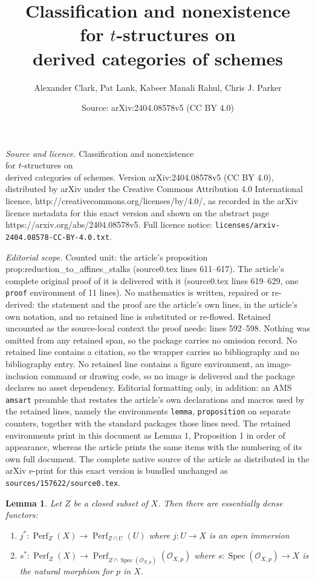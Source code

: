 \documentclass[10pt,a4paper]{amsart}
\title{Classification and nonexistence \\ for $t$-structures on \\ derived categories of schemes}
\author{Alexander Clark, Pat Lank, Kabeer Manali Rahul, Chris J. Parker}
\date{Source: arXiv:2404.08578v5 (CC BY 4.0)}
\newtheorem{lemma}{Lemma}
\begin{document}
\maketitle

\noindent\emph{Source and licence.} Classification and nonexistence \\ for $t$-structures on \\ derived categories of schemes. Version arXiv:2404.08578v5 (CC BY 4.0), distributed by arXiv under the Creative Commons Attribution 4.0 International licence, http://creativecommons.org/licenses/by/4.0/, as recorded in the arXiv licence metadata for this exact version and shown on the abstract page https://arxiv.org/abs/2404.08578v5. Full licence notice: \texttt{licenses/arxiv-2404.08578-CC-BY-4.0.txt}.\par\smallskip

\noindent\textit{Editorial scope.} Counted unit: the article's proposition prop:reduction\_to\_affines\_stalks (source0.tex lines 611--617). The article's complete original proof of it is delivered with it (source0.tex lines 619--629, one \texttt{proof} environment of 11 lines). No mathematics is written, repaired or re-derived: the statement and the proof are the article's own lines, in the article's own notation, and no retained line is substituted or re-flowed.  Retained uncounted as the source-local context the proof needs: lines 592--598.  Nothing was omitted from any retained span, so the package carries no omission record.  No retained line contains a citation, so the wrapper carries no bibliography and no bibliography entry.  No retained line contains a figure environment, an image-inclusion command or drawing code, so no image is delivered and the package declares no asset dependency.  Editorial formatting only, in addition: an AMS \texttt{amsart} preamble that restates the article's own declarations and macros used by the retained lines, namely the environments \texttt{lemma}, \texttt{proposition} on separate counters, together with the standard packages those lines need.  The retained environments print in this document as Lemma 1, Proposition 1 in order of appearance, whereas the article prints the same items with the numbering of its own full document.  The complete native source of the article as distributed in the arXiv e-print for this exact version is bundled unchanged as \texttt{sources/157622/source0.tex}.
\begin{lemma}\label{lem:global_to_open_perfect_supported}
    Let $Z$ be a closed subset of $X$. Then there are essentially dense functors:
    \begin{enumerate}
        \item $j^\ast \colon \operatorname{Perf}_Z (X)\to \operatorname{Perf}_{Z\cap U} (U)$ where $j\colon U \to X$ is an open immersion
        \item $s^\ast \colon \operatorname{Perf}_Z (X) \to \operatorname{Perf}_{Z\cap \operatorname{Spec}(\mathcal{O}_{X,p})} (\mathcal{O}_{X,p})$ where $s\colon \operatorname{Spec}(\mathcal{O}_{X,p}) \to X$ is the natural morphism for $p$ in $X$.
    \end{enumerate}
\end{lemma}
\end{document}
